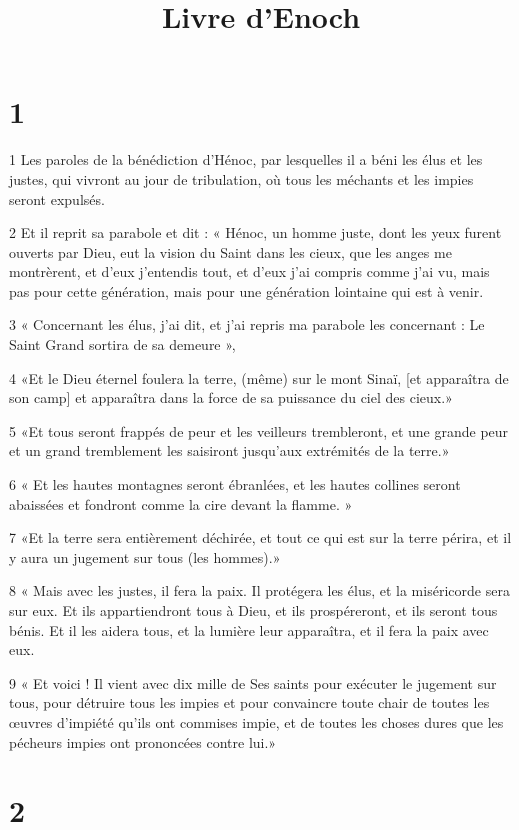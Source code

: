 

\title{Livre d'Enoch}


\chapter{1}

\par 1 Les paroles de la bénédiction d'Hénoc, par lesquelles il a béni les élus et les justes, qui vivront au jour de tribulation, où tous les méchants et les impies seront expulsés.
\par 2 Et il reprit sa parabole et dit : « Hénoc, un homme juste, dont les yeux furent ouverts par Dieu, eut la vision du Saint dans les cieux, que les anges me montrèrent, et d'eux j'entendis tout, et d'eux j'ai compris comme j'ai vu, mais pas pour cette génération, mais pour une génération lointaine qui est à venir.
\par 3 « Concernant les élus, j'ai dit, et j'ai repris ma parabole les concernant : Le Saint Grand sortira de sa demeure »,
\par 4 «Et le Dieu éternel foulera la terre, (même) sur le mont Sinaï, [et apparaîtra de son camp] et apparaîtra dans la force de sa puissance du ciel des cieux.»
\par 5 «Et tous seront frappés de peur et les veilleurs trembleront, et une grande peur et un grand tremblement les saisiront jusqu'aux extrémités de la terre.»
\par 6 « Et les hautes montagnes seront ébranlées, et les hautes collines seront abaissées et fondront comme la cire devant la flamme. »
\par 7 «Et la terre sera entièrement déchirée, et tout ce qui est sur la terre périra, et il y aura un jugement sur tous (les hommes).»
\par 8 « Mais avec les justes, il fera la paix. Il protégera les élus, et la miséricorde sera sur eux. Et ils appartiendront tous à Dieu, et ils prospéreront, et ils seront tous bénis. Et il les aidera tous, et la lumière leur apparaîtra, et il fera la paix avec eux.
\par 9 « Et voici ! Il vient avec dix mille de Ses saints pour exécuter le jugement sur tous, pour détruire tous les impies et pour convaincre toute chair de toutes les œuvres d'impiété qu'ils ont commises impie, et de toutes les choses dures que les pécheurs impies ont prononcées contre lui.»

\chapter{2}

